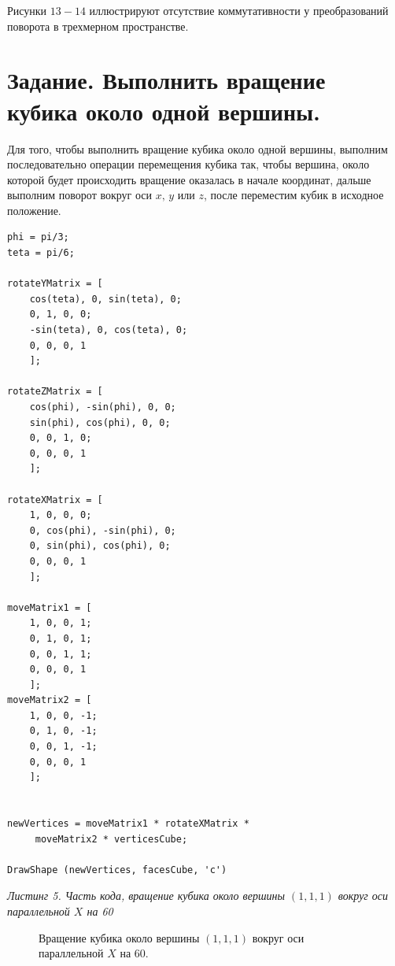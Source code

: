 \documentclass[a5paper, 10pt]{article}
\theoremstyle{definition}
\theoremstyle{plain}
\theoremstyle{remark}
\begin{document}
Рисунки $13-14$ иллюстрируют отсутствие коммутативности у преобразований поворота в трехмерном пространстве.














\newpage
\section{Задание. Выполнить вращение кубика около одной вершины.}
Для того, чтобы выполнить вращение кубика около одной вершины, выполним последовательно операции перемещения кубика так, чтобы вершина, около которой будет происходить вращение оказалась в начале координат, дальше выполним поворот вокруг оси $x, \, y$ или $z$, после переместим кубик в исходное положение.

\begin{center}
\begin{lstlisting}
phi = pi/3;
teta = pi/6;

rotateYMatrix = [
    cos(teta), 0, sin(teta), 0;
    0, 1, 0, 0;
    -sin(teta), 0, cos(teta), 0;
    0, 0, 0, 1
    ];

rotateZMatrix = [
    cos(phi), -sin(phi), 0, 0;
    sin(phi), cos(phi), 0, 0;
    0, 0, 1, 0;
    0, 0, 0, 1
    ];

rotateXMatrix = [
    1, 0, 0, 0;
    0, cos(phi), -sin(phi), 0;
    0, sin(phi), cos(phi), 0;
    0, 0, 0, 1
    ];

moveMatrix1 = [
    1, 0, 0, 1;
    0, 1, 0, 1;
    0, 0, 1, 1;
    0, 0, 0, 1
    ];
moveMatrix2 = [
    1, 0, 0, -1;
    0, 1, 0, -1;
    0, 0, 1, -1;
    0, 0, 0, 1
    ];


newVertices = moveMatrix1 * rotateXMatrix *
	 moveMatrix2 * verticesCube;

DrawShape (newVertices, facesCube, 'c')
\end{lstlisting}
\textit{Листинг 5. Часть кода, вращение кубика около вершины $(1, 1, 1)$ вокруг оси параллельной $X$ на 60\textdegree}
\end{center}

\begin{figure}[h!]
\caption{Вращение кубика около вершины $(1, 1, 1)$ вокруг оси параллельной $X$ на 60\textdegree.}
\end{figure}
\end{document}

